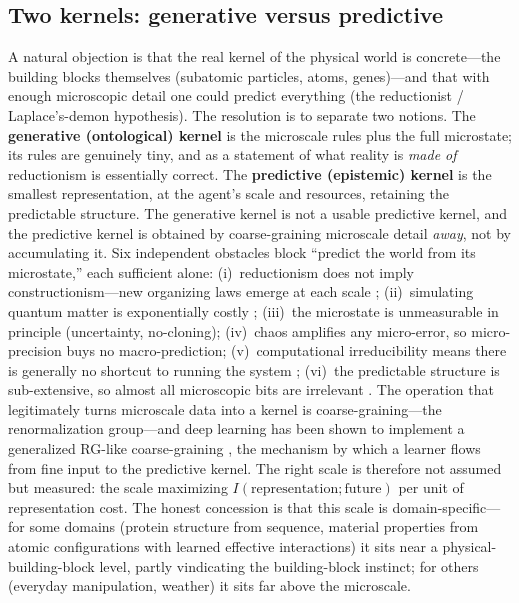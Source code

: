 \documentclass[10pt,twocolumn]{article}
\begin{document}
\subsection{Two kernels: generative versus predictive}
A natural objection is that the real kernel of the physical world is concrete---the
building blocks themselves (subatomic particles, atoms, genes)---and that with
enough microscopic detail one could predict everything (the reductionist /
Laplace's-demon hypothesis). The resolution is to separate two notions. The
\textbf{generative (ontological) kernel} is the microscale rules plus the full
microstate; its rules are genuinely tiny, and as a statement of what reality is
\emph{made of} reductionism is essentially correct. The \textbf{predictive
(epistemic) kernel} is the smallest representation, at the agent's scale and
resources, retaining the predictable structure. The generative kernel is not a
usable predictive kernel, and the predictive kernel is obtained by coarse-graining
microscale detail \emph{away}, not by accumulating it. Six independent obstacles
block ``predict the world from its microstate,'' each sufficient alone:
(i)~reductionism does not imply constructionism---new organizing laws emerge at
each scale \citep{anderson1972more}; (ii)~simulating quantum matter is
exponentially costly \citep{feynman1982simulating}; (iii)~the microstate is
unmeasurable in principle (uncertainty, no-cloning); (iv)~chaos amplifies any
micro-error, so micro-precision buys no macro-prediction; (v)~computational
irreducibility means there is generally no shortcut to running the system
\citep{wolfram2002nks}; (vi)~the predictable structure is sub-extensive, so almost
all microscopic bits are irrelevant \citep{bialek2001predictability}. The
operation that legitimately turns microscale data into a kernel is
coarse-graining---the renormalization group---and deep learning has been shown to
implement a generalized RG-like coarse-graining \citep{mehta2014exact}, the
mechanism by which a learner flows from fine input to the predictive kernel. The
right scale is therefore not assumed but measured: the scale maximizing
$I(\text{representation};\text{future})$ per unit of representation cost. The
honest concession is that this scale is domain-specific---for some domains
(protein structure from sequence, material properties from atomic configurations
with learned effective interactions) it sits near a physical-building-block level,
partly vindicating the building-block instinct; for others (everyday manipulation,
weather) it sits far above the microscale.
\end{document}
